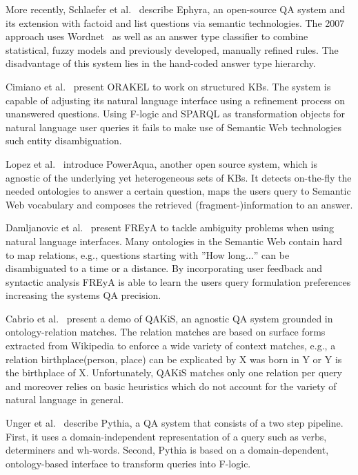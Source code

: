 More recently, {Schlaefer et al.~\cite{ephyra2007}} describe {Ephyra}, an open-source \ac{QA} system and its extension with factoid and list questions via semantic technologies.
The 2007 approach uses Wordnet~\cite{wordnet} as well as an answer type classifier to combine statistical, fuzzy models and previously developed, manually refined rules. The disadvantage of this system lies in the hand-coded answer type hierarchy. %

Cimiano et al.~\cite{orakel} present {ORAKEL} to work on structured \ac{KB}s.
The system is capable of adjusting its natural language interface using a refinement process on unanswered questions. 
Using F-logic and SPARQL as transformation objects for natural language user queries it fails to make use of Semantic Web technologies such entity disambiguation.

{Lopez et al.~\cite{poweraqua}} introduce {PowerAqua}, another open source system, which is agnostic of the underlying yet heterogeneous sets of \ac{KB}s. 
It detects on-the-fly the needed ontologies to answer a certain question, maps the users query to Semantic Web vocabulary and composes the retrieved (fragment-)information to an answer. 

{Damljanovic et al.~\cite{freya}} present {FREyA} to tackle ambiguity problems when using natural language interfaces. 
Many ontologies in the Semantic Web contain hard to map relations, e.g., questions starting with ''How long$\ldots$'' can be disambiguated to a time or a distance. 
By incorporating user feedback and syntactic analysis FREyA is able to learn the users query formulation preferences increasing the systems \ac{QA} precision. 

{Cabrio et al.~\cite{qakis}} present a demo of {QAKiS}, an agnostic \ac{QA} system grounded in ontology-relation matches. 
The relation matches are based on surface forms extracted from Wikipedia to enforce a wide variety of context matches, e.g., a relation birthplace(person, place) can be explicated by X was born in Y or Y is the birthplace of X. 
Unfortunately, QAKiS matches only one relation per query and moreover relies on basic heuristics which do not account for the variety of natural language in general.

{Unger et al.~\cite{pythia}} describe {Pythia}, a \ac{QA} system that consists of a two step pipeline.
First, it uses a domain-independent representation of a query such as verbs, determiners and wh-words.
Second, Pythia is based on a domain-dependent, ontology-based interface to transform queries into F-logic.


